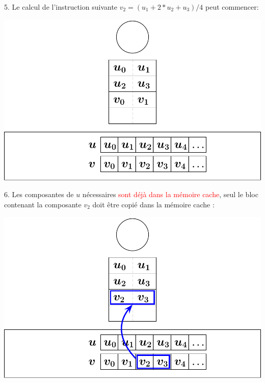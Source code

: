 \documentclass{beamer}
\begin{document}
\begin{frame}
	\parbox[t][1cm]{10cm}{5. Le calcul de l'instruction suivante $v_2 = (u_1 + 2*u_2 + u_3)/4$ peut commencer:}
	\begin{center}
		\includegraphics[scale=0.6]{../../Images/sequentiel4}
	\end{center}
\end{frame}
\begin{frame}
	\parbox[t][1cm]{10cm}{6. Les composantes de $u$ nécessaires \textcolor{red}{sont déjà dans la mémoire cache}, seul le bloc contenant la composante $v_2$ doit être copié dans la mémoire cache :}
	\begin{center}
		\includegraphics[scale=0.6]{../../Images/sequentiel5}
	\end{center}
\end{frame}
\end{document}
